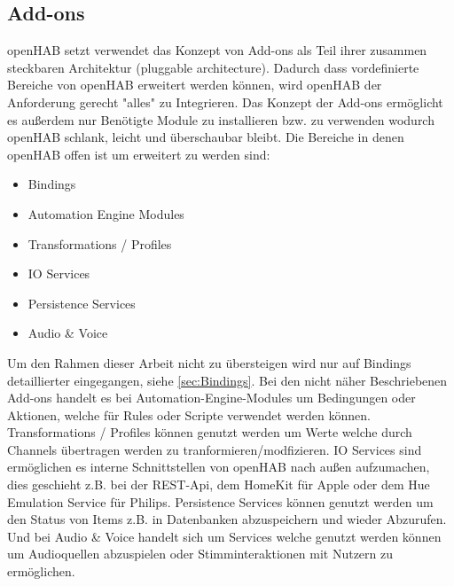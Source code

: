 \subsection{Add-ons}
openHAB setzt verwendet das Konzept von Add-ons als Teil ihrer zusammen steckbaren Architektur (pluggable architecture). Dadurch dass vordefinierte Bereiche von openHAB erweitert werden können, wird openHAB der Anforderung gerecht "alles" zu Integrieren. Das Konzept der Add-ons ermöglicht es außerdem nur Benötigte Module zu installieren bzw. zu verwenden wodurch openHAB schlank, leicht und überschaubar bleibt. Die Bereiche in denen openHAB offen ist um erweitert zu werden sind:
\begin{itemize}
	\item Bindings
	\item Automation Engine Modules
	\item Transformations / Profiles
	\item IO Services
	\item Persistence Services
	\item Audio \& Voice
\end{itemize}
Um den Rahmen dieser Arbeit nicht zu übersteigen wird nur auf Bindings detaillierter eingegangen, siehe \ref{sec:Bindings}. Bei den nicht näher Beschriebenen Add-ons handelt es bei Automation-Engine-Modules um Bedingungen oder Aktionen, welche für Rules oder Scripte verwendet werden können. Transformations / Profiles können genutzt werden um Werte welche durch Channels übertragen werden zu tranformieren/modfizieren. IO Services sind ermöglichen es interne Schnittstellen von openHAB nach außen aufzumachen, dies geschieht z.B. bei der REST-Api, dem HomeKit für Apple oder dem Hue Emulation Service für Philips. Persistence Services können genutzt werden um den Status von Items z.B. in Datenbanken abzuspeichern und wieder Abzurufen. Und bei Audio \& Voice handelt sich um Services welche genutzt werden können um Audioquellen abzuspielen oder Stimminteraktionen mit Nutzern zu ermöglichen. 

